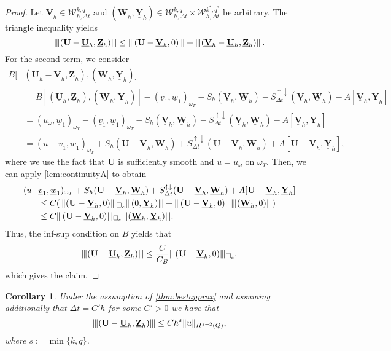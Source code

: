 \documentclass[sn-mathphys-num]{sn-jnl}
\newtheorem{cor}[thm]{Corollary}
\numberwithin{equation}{section}
\newcommand{\wop}{\square_c}
\newcommand{\tnorm}[1]{\vert\hspace{-0.3mm}\Vert#1\Vert\hspace{-0.3mm}\vert}
\newcommand{\ProdFullyDiscrSpace}[2]{ \mathcal{W}^{ {#1},{#2}}_{h, \Delta t  } }
\newcommand{\Uh}{\underline{\mathbf{U}}_h}
\newcommand{\Vh}{\underline{\mathbf{V}}_h}
\newcommand{\Yh}{\underline{\mathbf{Y}}_h}
\newcommand{\Zh}{\underline{\mathbf{Z}}_h}
\newcommand{\Wh}{\underline{\mathbf{W}}_h}
\newcommand{\Sud}{S^{\uparrow \downarrow}_{\Delta t}}
\begin{document}
\begin{proof}
    Let $\Vh \in \ProdFullyDiscrSpace{k}{q}$  and $(\Wh,\Yh) \in \ProdFullyDiscrSpace{k}{q} \times \ProdFullyDiscrSpace{k^\ast}{q^\ast}$ be arbitrary. The triangle inequality yields 
    \begin{equation*}
        \tnorm{(\mathbf{U} - \Uh,\Zh)} \le \tnorm{(\mathbf{U} - \Vh,0)} + \tnorm{(\Vh - \Uh,\Zh)}.
    \end{equation*}
    For the second term, we consider
    \begin{align*}
        B[&(\Uh - \Vh, \Zh),( \Wh, \Yh)] \\
        &= B[(\Uh,\Zh),( \Wh, \Yh)] - (\underline{v}_1, \underline{w}_1)_{\omega_T} - S_h(\Vh,\Wh) - \Sud(\Vh,\Wh) - A[\Vh,\Yh] \\
        &= (u_{\omega}, \underline{w}_1)_{\omega_T} - (\underline{v}_1, \underline{w}_1)_{\omega_T} - S_h(\Vh,\Wh) - \Sud(\Vh,\Wh) - A[\Vh,\Yh] \\
        &= (u - \underline{v}_1, \underline{w}_1)_{\omega_T}  +  S_h(\mathbf{U} - \Vh,\Wh) + \Sud(\mathbf{U} - \Vh,\Wh) + A[\mathbf{U} - \Vh,\Yh],
    \end{align*} 
    where we use the fact that $\mathbf{U}$ is sufficiently smooth and $u = u_{\omega}$ on $\omega_T$. Then, we can apply \cref{lem:continuityA} to obtain 
    \begin{align*}
        (u - &\underline{v}_1, \underline{w}_1)_{\omega_T}  +  S_h(\mathbf{U} - \Vh,\Wh) + \Sud(\mathbf{U} - \Vh,\Wh) + A[\mathbf{U} - \Vh,\Yh] \\
        &\le C(\tnorm{(\mathbf{U} - \Vh,0)}_{\wop} \tnorm{(0,\Yh)}  + \tnorm{(\mathbf{U} - \Vh,0)} \tnorm{(\Wh,0)} ) \\
        &\le C \tnorm{(\mathbf{U} - \Vh,0)}_{\wop} \tnorm{(\Wh,\Yh)}.
    \end{align*}
    Thus, the inf-sup condition on $B$ yields that 
    \begin{equation*}
    \tnorm{(\mathbf{U} - \Uh,\Zh)} \le \frac{C}{C_B} \tnorm{(\mathbf{U} - \Vh, 0)}_{\wop},
    \end{equation*}
    which gives the claim. 
\end{proof}


\begin{cor}\label{cor:tnormConvRates }
    Under the assumption of \cref{thm:bestapprox} and assuming additionally that $\Delta t = C' h$ for some $C'>0$ we have that
    \begin{equation*}
	    \tnorm{(\mathbf{U} - \Uh,\Zh)} \le C h^s \Vert u \Vert_{H^{s+2}(Q)},
    \end{equation*}
    where $s := \min\{ k,q \}$.
\end{cor}
\end{document}
